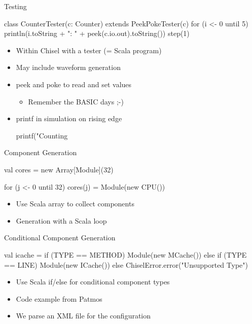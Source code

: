 \begin{frame}[fragile]{Testing}
\begin{chisel}
class CounterTester(c: Counter) extends PeekPokeTester(c) {
  for (i <- 0 until 5) {
    println(i.toString + ": " + peek(c.io.out).toString())
    step(1)
  }
}
\end{chisel}
\begin{itemize}
\item Within Chisel with a tester (= Scala program)
\item May include waveform generation
\item peek and poke to read and set values
\begin{itemize}
\item Remember the BASIC days ;-)
\end{itemize}
\item printf in simulation on rising edge
\begin{chisel}
printf("Counting %
\end{chisel}
\end{itemize}
\end{frame}

\begin{frame}[fragile]{Component Generation}
\begin{chisel}
val cores = new Array[Module](32)

for (j <- 0 until 32)
  cores(j) = Module(new CPU())
\end{chisel}
\begin{itemize}
\item Use Scala array to collect components
\item Generation with a Scala loop
\end{itemize}
\end{frame}

\begin{frame}[fragile]{Conditional Component Generation}
\begin{chisel}
val icache =
  if (TYPE == METHOD)
    Module(new MCache())
  else if (TYPE == LINE)
    Module(new ICache())
  else
    ChiselError.error("Unsupported Type")
\end{chisel}
\begin{itemize}
\item Use Scala if/else for conditional component types
\item Code example from Patmos
\item We parse an XML file for the configuration
\end{itemize}
\end{frame}


